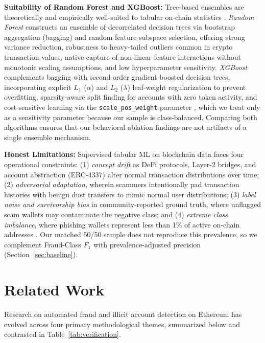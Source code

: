 \documentclass[conference]{IEEEtran}
\begin{document}
\textbf{Suitability of Random Forest and XGBoost:} Tree-based ensembles are theoretically and empirically well-suited to tabular on-chain statistics \cite{farrugia2020, chithanuru2025}. \emph{Random Forest} constructs an ensemble of decorrelated decision trees via bootstrap aggregation (bagging) and random feature subspace selection, offering strong variance reduction, robustness to heavy-tailed outliers common in crypto transaction values, native capture of non-linear feature interactions without monotonic scaling assumptions, and low hyperparameter sensitivity. \emph{XGBoost} complements bagging with second-order gradient-boosted decision trees, incorporating explicit $L_1$ ($\alpha$) and $L_2$ ($\lambda$) leaf-weight regularization to prevent overfitting, sparsity-aware split finding for accounts with zero token activity, and cost-sensitive learning via the \texttt{scale\_pos\_weight} parameter \cite{gu2025}, which we treat only as a sensitivity parameter because our sample is class-balanced. Comparing both algorithms ensures that our behavioral ablation findings are not artifacts of a single ensemble mechanism.

\textbf{Honest Limitations:} Supervised tabular ML on blockchain data faces four operational constraints: (1) \emph{concept drift} as DeFi protocols, Layer-2 bridges, and account abstraction (ERC-4337) alter normal transaction distributions over time; (2) \emph{adversarial adaptation}, wherein scammers intentionally pad transaction histories with benign dust transfers to mimic normal user distributions; (3) \emph{label noise and survivorship bias} in community-reported ground truth, where unflagged scam wallets may contaminate the negative class; and (4) \emph{extreme class imbalance}, where phishing wallets represent less than 1\% of active on-chain addresses \cite{wu2020, li2022}. Our matched 50/50 sample does not reproduce this prevalence, so we complement Fraud-Class $F_1$ with prevalence-adjusted precision (Section~\ref{sec:baseline}).

\section{Related Work}

Research on automated fraud and illicit account detection on Ethereum has evolved across four primary methodological themes, summarized below and contrasted in Table~\ref{tab:verification}.
\end{document}
